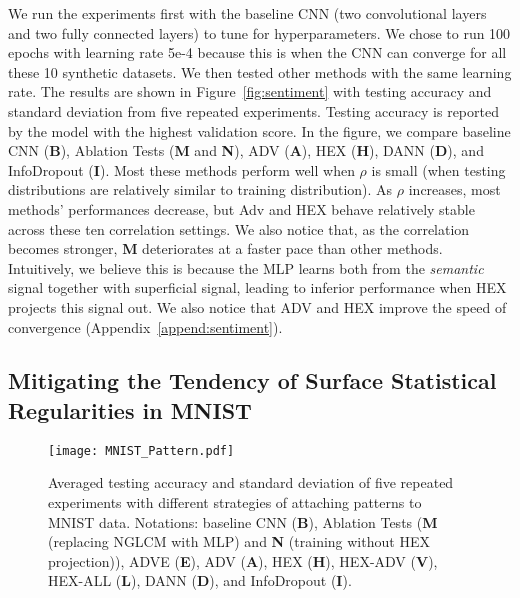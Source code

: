 We run the experiments first with the baseline CNN 
(two convolutional layers and two fully connected layers) 
to tune for hyperparameters. 
We chose to run 100 epochs with learning rate 5e-4 
because this is when the CNN can converge for all these 10 synthetic datasets. 
We then tested other methods with the same learning rate. 
The results are shown in Figure~\ref{fig:sentiment} 
with testing accuracy and standard deviation 
from five repeated experiments. 
Testing accuracy is reported by the model 
with the highest validation score. 
In the figure, we compare baseline CNN (\textbf{B}), Ablation Tests (\textbf{M} and \textbf{N}), ADV (\textbf{A}), HEX (\textbf{H}), DANN (\textbf{D}), and InfoDropout (\textbf{I}). 
Most these methods perform well when $\rho$ is small 
(when testing distributions are relatively similar to training distribution). 
As $\rho$ increases, most methods' performances decrease, 
but Adv and HEX behave relatively stable across these ten correlation settings. We also notice that, as the correlation becomes stronger, 
\textbf{M} deteriorates at a faster pace than other methods. 
Intuitively, we believe this is because the MLP learns both from the  
\emph{semantic} signal together with superficial signal, 
leading to inferior performance when HEX projects this signal out. 
We also notice that ADV and HEX improve the speed of convergence (Appendix~\ref{append:sentiment}). 

\subsection{Mitigating the Tendency of Surface Statistical Regularities in MNIST}


\begin{figure}
    \centering
    \texttt{[image: MNIST\_Pattern.pdf]}
    \caption{Averaged testing accuracy and standard deviation of five repeated experiments with different strategies of attaching patterns to MNIST data. Notations: baseline CNN (\textbf{B}), Ablation Tests (\textbf{M} (replacing NGLCM with MLP) and \textbf{N} (training without HEX projection)), ADVE (\textbf{E}), ADV (\textbf{A}), HEX (\textbf{H}), HEX-ADV (\textbf{V}), HEX-ALL (\textbf{L}), DANN (\textbf{D}), and InfoDropout (\textbf{I}).}
    \label{fig:MNIST_P}
\end{figure}

